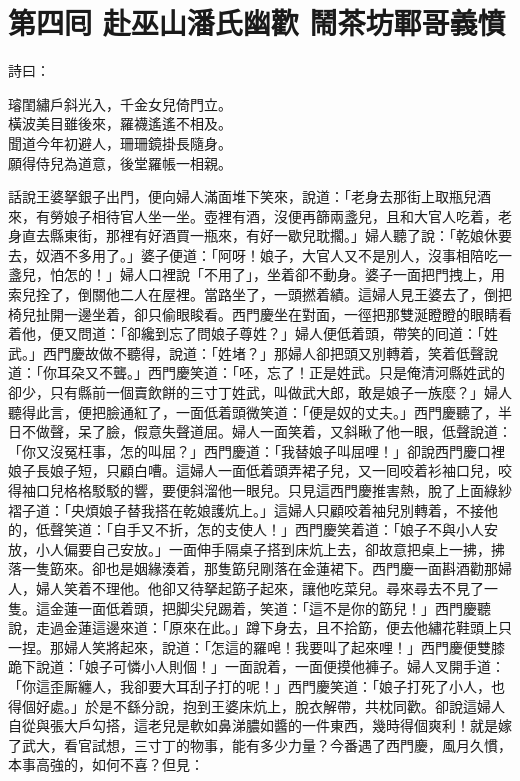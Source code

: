 
\chapter*{第四囘 赴巫山潘氏幽歡 鬧茶坊鄆哥義憤}


詩曰：

\begin{myquote} 
璿閨繡戶斜光入，千金女兒倚門立。\\橫波美目雖後來，羅襪遙遙不相及。\\聞道今年初避人，珊珊鏡掛長隨身。\\願得侍兒為道意，後堂羅帳一相親。
\end{myquote} 

話說王婆拏銀子出門，便向婦人滿面堆下笑來，說道：「老身去那街上取瓶兒酒來，有勞娘子相待官人坐一坐。壺裡有酒，沒便再篩兩盞兒，且和大官人吃着，老身直去縣東街，那裡有好酒買一瓶來，有好一歇兒耽擱。」{}婦人聽了說：「乾娘休要去，奴酒不多用了。」{}婆子便道：「阿呀！娘子，大官人又不是別人，{}沒事相陪吃一盞兒，怕怎的！」婦人口裡說「不用了」，坐着卻不動身。婆子一面把門拽上，用索兒拴了，倒關他二人在屋裡。當路坐了，一頭撚着績。這婦人見王婆去了，倒把椅兒扯開一邊坐着，{}卻只偷眼睃看。{}西門慶坐在對面，一徑把那雙涎瞪瞪的眼睛看着他，便又問道：「卻纔到忘了問娘子尊姓？」婦人便低着頭，帶笑的囘道：「姓武。」西門慶故做不聽得，說道：「姓堵？」那婦人卻把頭又別轉着，笑着低聲說道：「你耳朶又不聾。」西門慶笑道：「呸，忘了！正是姓武。只是俺清河縣姓武的卻少，只有縣前一個賣飲餅的三寸丁姓武，叫做武大郎，敢是娘子一族麼？」{}婦人聽得此言，便把臉通紅了，一面低着頭微笑道：「便是奴的丈夫。」西門慶聽了，半日不做聲，呆了臉，假意失聲道屈。婦人一面笑着，又斜瞅了他一眼，{}低聲說道：「你又沒冤枉事，怎的叫屈？」西門慶道：「我替娘子叫屈哩！」卻說西門慶口裡娘子長娘子短，只顧白嘈。這婦人一面低着頭弄裙子兒，又一囘咬着衫袖口兒，咬得袖口兒格格駁駁的響，要便斜溜他一眼兒。{}只見這西門慶推害熱，脫了上面綠紗褶子道：「央煩娘子替我搭在乾娘護炕上。」這婦人只顧咬着袖兒別轉着，不接他的，低聲笑道：「自手又不折，怎的支使人！」{}西門慶笑着道：「娘子不與小人安放，小人偏要自己安放。」一面伸手隔桌子搭到床炕上去，卻故意把桌上一拂，拂落一隻筯來。卻也是姻緣湊着，那隻筯兒剛落在金蓮裙下。西門慶一面斟酒勸那婦人，婦人笑着不理他。他卻又待拏起筯子起來，讓他吃菜兒。尋來尋去不見了一隻。這金蓮一面低着頭，把脚尖兒踢着，笑道：「這不是你的筯兒！」西門慶聽說，走過金蓮這邊來道：「原來在此。」蹲下身去，且不拾筯，便去他繡花鞋頭上只一捏。那婦人笑將起來，說道：「怎這的羅唣！我要叫了起來哩！」西門慶便雙膝跪下說道：「娘子可憐小人則個！」一面說着，一面便摸他褲子。婦人叉開手道：「你這歪厮纏人，我卻要大耳刮子打的呢！」西門慶笑道：「娘子打死了小人，也得個好處。」於是不繇分說，抱到王婆床炕上，脫衣解帶，共枕同歡。卻說這婦人自從與張大戶勾搭，這老兒是軟如鼻涕膿如醬的一件東西，幾時得個爽利！就是嫁了武大，看官試想，三寸丁的物事，能有多少力量？今番遇了西門慶，風月久慣，本事高強的，如何不喜？但見：

